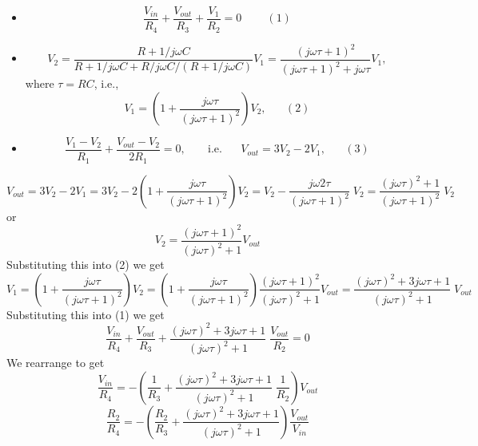 \documentclass{article}
\begin{document}
\begin{itemize}
\item
  \begin{equation}
  \frac{V_{in}}{R_4}+\frac{V_{out}}{R_3}+\frac{V_1}{R_2}=0\;\;\;\;\;\;\;\;(1)
  \end{equation}
\item
  \begin{equation}
  V_2=\frac{R+1/j\omega C}{R+1/j\omega C+R/j\omega C/(R+1/j\omega C)}V_1
  =\frac{(j\omega\tau+1)^2}{(j\omega\tau+1)^2+j\omega\tau}V_1,
  \end{equation}
  where $\tau=RC$, i.e.,
  \begin{equation}
  V_1=\left(1+\frac{j\omega\tau}{(j\omega\tau+1)^2}\right)V_2,\;\;\;\;\;\;(2)
  \end{equation}
\item
  \begin{equation}
    \frac{V_1-V_2}{R_1}+\frac{V_{out}-V_2}{2R_1}=0,
      \;\;\;\;\;\;\;\mbox{i.e.}\;\;\;\;\;\; V_{out}=3V_2-2V_1,\;\;\;\;\;\;(3)
  \end{equation}
\end{itemize}
\begin{equation}
V_{out}=3V_2-2V_1=3V_2-2\left(1+\frac{j\omega\tau}{(j\omega\tau+1)^2}\right)V_2
=V_2-\frac{j\omega 2\tau}{(j\omega\tau+1)^2}\;V_2
=\frac{(j\omega\tau)^2+1}{(j\omega\tau+1)^2}\;V_2
\end{equation}
or
\begin{equation}
V_2=\frac{(j\omega\tau+1)^2}{(j\omega\tau)^2+1}V_{out}
\end{equation}
Substituting this into (2) we get
\begin{equation}
V_1=\left(1+\frac{j\omega\tau}{(j\omega\tau+1)^2}\right)V_2
=\left(1+\frac{j\omega\tau}{(j\omega\tau+1)^2}\right)\frac{(j\omega\tau+1)^2}{(j\omega\tau)^2+1}V_{out}
=\frac{(j\omega\tau)^2+3j\omega\tau+1}{(j\omega\tau)^2+1}\;V_{out}
\end{equation}
Substituting this into (1) we get
\begin{equation}
\frac{V_{in}}{R_4}+\frac{V_{out}}{R_3}
+\frac{(j\omega\tau)^2+3j\omega\tau+1}{(j\omega\tau)^2+1}\;\frac{V_{out}}{R_2}=0
\end{equation}
We rearrange to get
\begin{equation}
\frac{V_{in}}{R_4}=-\left(\frac{1}{R_3}
+\frac{(j\omega\tau)^2+3j\omega\tau+1}{(j\omega\tau)^2+1}\;\frac{1}{R_2}\right)V_{out}
\end{equation}
\begin{equation}
\frac{R_2}{R_4}=-\left(\frac{R_2}{R_3}
+\frac{(j\omega\tau)^2+3j\omega\tau+1}{(j\omega\tau)^2+1}\right)
\frac{V_{out}}{V_{in}}
\end{equation}
\end{document}
